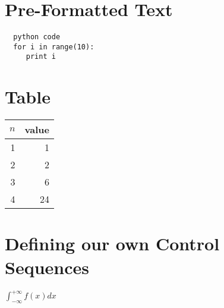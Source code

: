 \documentclass{beamer}
\begin{document}
  \section{Pre-Formatted Text}
  \begin{verbatim}
  python code  
  for i in range(10):
     print i
  \end{verbatim}

  \section{Table}
  \begin{tabular}{|r|r|}
    \hline
    $n$ & value \\
    \hline
    1   &  1  \\ 
    2   &  2  \\
    3   &  6  \\ 
    4   &  24 \\ 
    \hline
  \end{tabular}

  \section{Defining our own Control Sequences}

  \newcommand{\intmp}[1]{\int_{-\infty}^{+\infty} #1 dx}

  $\intmp{f(x)}$
\end{document}
